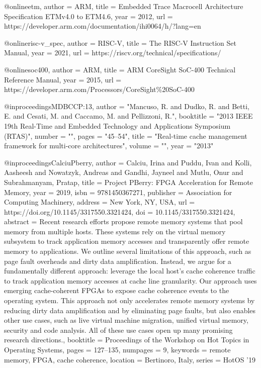 @online{etm,
  author = {ARM},
  title = {Embedded Trace Macrocell Architecture Specification ETMv4.0 to ETM4.6},
  year = 2012,
  url = {https://developer.arm.com/documentation/ihi0064/h/?lang=en}
}

@online{risc-v_spec,
  author = {RISC-V},
  title = {The RISC-V Instruction Set Manual},
  year = 2021,
  url = {https://riscv.org/technical/specifications/}
}

@online{soc400,
  author = {ARM},
  title = {{ARM CoreSight SoC-400 Technical Reference Manual}},
  year = 2015,
  url = {https://developer.arm.com/Processors/CoreSight\%20SoC-400}
}

@inproceedings{MDBCCP:13,
	author = "{Mancuso}, R. and {Dudko}, R. and {Betti}, E. and {Cesati}, M. and {Caccamo}, M. and {Pellizzoni}, R.",
	booktitle = "{2013 IEEE 19th Real-Time and Embedded Technology and Applications Symposium (RTAS)}",
	number = "",
	pages = "45–54",
	title = "{Real-time cache management framework for multi-core architectures}",
	volume = "",
	year = "2013"
}

@inproceedings{CalciuPberry,
author = {Calciu, Irina and Puddu, Ivan and Kolli, Aasheesh and Nowatzyk, Andreas and Gandhi, Jayneel and Mutlu, Onur and Subrahmanyam, Pratap},
title = {Project PBerry: FPGA Acceleration for Remote Memory},
year = {2019},
isbn = {9781450367271},
publisher = {Association for Computing Machinery},
address = {New York, NY, USA},
url = {https://doi.org/10.1145/3317550.3321424},
doi = {10.1145/3317550.3321424},
abstract = {Recent research efforts propose remote memory systems that pool memory from multiple hosts. These systems rely on the virtual memory subsystem to track application memory accesses and transparently offer remote memory to applications. We outline several limitations of this approach, such as page fault overheads and dirty data amplification. Instead, we argue for a fundamentally different approach: leverage the local host's cache coherence traffic to track application memory accesses at cache line granularity. Our approach uses emerging cache-coherent FPGAs to expose cache coherence events to the operating system. This approach not only accelerates remote memory systems by reducing dirty data amplification and by eliminating page faults, but also enables other use cases, such as live virtual machine migration, unified virtual memory, security and code analysis. All of these use cases open up many promising research directions.},
booktitle = {Proceedings of the Workshop on Hot Topics in Operating Systems},
pages = {127–135},
numpages = {9},
keywords = {remote memory, FPGA, cache coherence},
location = {Bertinoro, Italy},
series = {HotOS '19}
}


